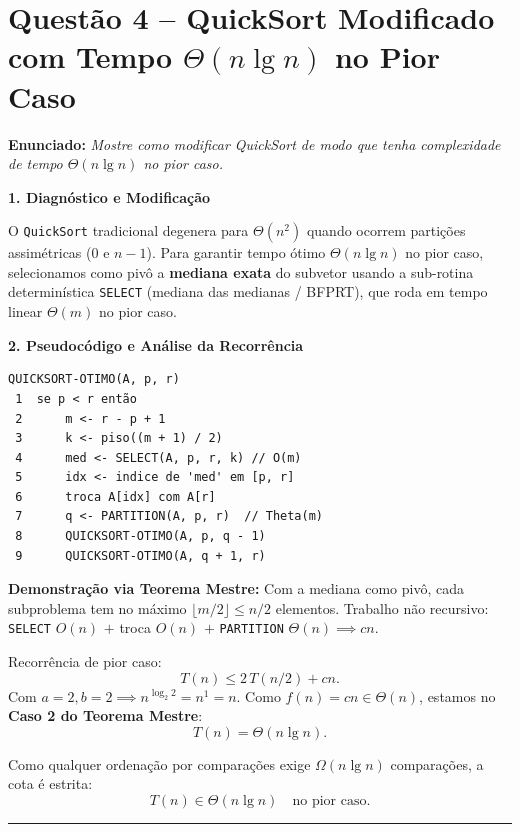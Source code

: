 \documentclass[10pt,a4paper]{article}
\newcommand{\resmath}[1]{\[\boxed{#1}\]}
\newcommand{\topico}[1]{\smallskip\noindent\textbf{\color{azul}#1}\par}
\newcommand{\questao}[2]{\section*{\large\color{azul}Questão #1 -- #2}\vspace{-4pt}}
\begin{document}
\clearpage
\questao{4}{QuickSort Modificado com Tempo $\Theta(n \lg n)$ no Pior Caso}

\textbf{Enunciado:} \textit{Mostre como modificar QuickSort de modo que tenha complexidade de tempo $\Theta(n \lg n)$ no pior caso.}

\topico{1. Diagnóstico e Modificação}
O \texttt{QuickSort} tradicional degenera para $\Theta(n^2)$ quando ocorrem partições assimétricas ($0$ e $n-1$).
Para garantir tempo ótimo $\Theta(n \lg n)$ no pior caso, selecionamos como pivô a \textbf{mediana exata} do subvetor usando a sub-rotina determinística \texttt{SELECT} (mediana das medianas / BFPRT), que roda em tempo linear $\Theta(m)$ no pior caso.

\topico{2. Pseudocódigo e Análise da Recorrência}
\begin{minipage}[t]{0.48\textwidth}
\begin{lstlisting}
QUICKSORT-OTIMO(A, p, r)
 1  se p < r então
 2      m <- r - p + 1
 3      k <- piso((m + 1) / 2)
 4      med <- SELECT(A, p, r, k) // O(m)
 5      idx <- indice de 'med' em [p, r]
 6      troca A[idx] com A[r]
 7      q <- PARTITION(A, p, r)  // Theta(m)
 8      QUICKSORT-OTIMO(A, p, q - 1)
 9      QUICKSORT-OTIMO(A, q + 1, r)
\end{lstlisting}
\end{minipage}
\hfill
\begin{minipage}[t]{0.48\textwidth}
\textbf{Demonstração via Teorema Mestre:}
Com a mediana como pivô, cada subproblema tem no máximo $\lfloor m/2 \rfloor \le n/2$ elementos.
Trabalho não recursivo: \texttt{SELECT} $O(n)$ $+$ troca $O(n)$ $+$ \texttt{PARTITION} $\Theta(n) \implies cn$.

Recorrência de pior caso:
\[
T(n) \le 2\,T(n/2) + cn.
\]
Com $a = 2, b = 2 \implies n^{\log_2 2} = n^1 = n$. Como $f(n) = cn \in \Theta(n)$, estamos no \textbf{Caso 2 do Teorema Mestre}:
\[
T(n) = \Theta(n \lg n).
\]
\end{minipage}

Como qualquer ordenação por comparações exige $\Omega(n \lg n)$ comparações, a cota é estrita:
\resmath{T(n) \in \Theta(n \lg n) \quad \text{no pior caso.}}

\vspace{4pt}
\hrule
\vspace{4pt}
\end{document}

